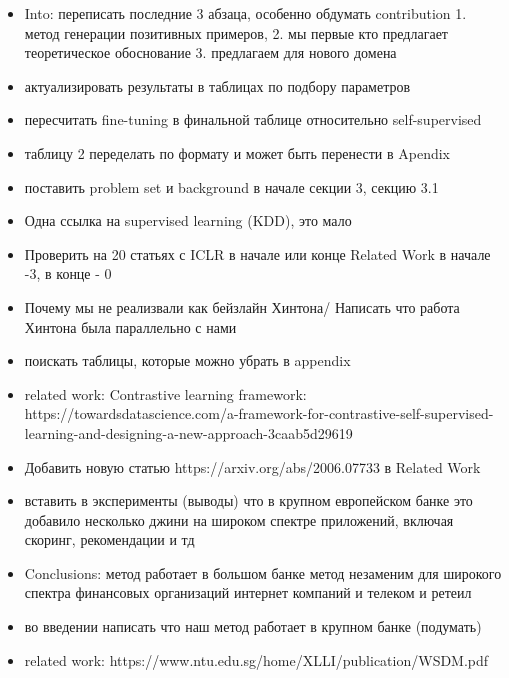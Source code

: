 \documentclass{article}
\begin{document}
\begin{itemize}
\item Into: переписать последние 3 абзаца, особенно обдумать contribution  1. метод генерации позитивных примеров, 2. мы первые кто предлагает теоретическое обоснование 3. предлагаем для нового домена 


\item актуализировать результаты в таблицах по подбору параметров

\item пересчитать fine-tuning в финальной таблице относительно self-supervised


\item таблицу 2 переделать по формату и может быть перенести в Apendix

\item поставить problem set и background в начале секции 3, секцию 3.1

\item  Одна ссылка на supervised learning (KDD), это мало

\item Проверить на 20 статьях с ICLR в начале или конце Related Work в начале -3, в конце - 0

\item Почему мы не реализвали как бейзлайн Хинтона/ Написать что работа Хинтона была параллельно с нами

\item поискать таблицы, которые можно убрать в appendix

\item related work: Contrastive learning framework: https://towardsdatascience.com/a-framework-for-contrastive-self-supervised-learning-and-designing-a-new-approach-3caab5d29619

\item Добавить новую статью https://arxiv.org/abs/2006.07733 в Related Work

\item вставить в эксперименты (выводы) что в крупном европейском банке это добавило несколько джини на широком спектре приложений, включая скоринг, рекомендации и тд

\item Conclusions: метод работает в большом банке метод незаменим для широкого спектра финансовых организаций интернет компаний и телеком и ретеил 

\item во введении написать что наш метод работает в крупном банке (подумать)

\item related work: https://www.ntu.edu.sg/home/XLLI/publication/WSDM.pdf


\end{itemize}
\end{document}
